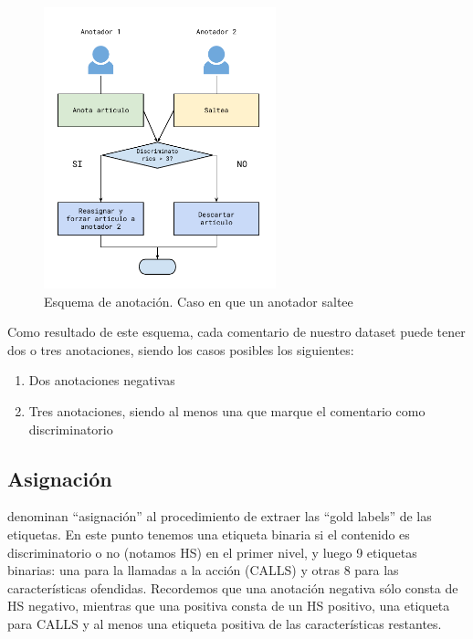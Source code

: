 \begin{figure}
    \centering
    \includegraphics[width=0.6\textwidth]{img/esquema_anotacion_caso_2.pdf}
    \caption{Esquema de anotación. Caso en que un anotador saltee}
    \label{fig:annotation_schema_case_two}
\end{figure}


Como resultado de este esquema, cada comentario de nuestro dataset puede tener dos o tres anotaciones, siendo los casos posibles los siguientes:

\begin{enumerate}
    \item Dos anotaciones negativas
    \item Tres anotaciones, siendo al menos una que marque el comentario como discriminatorio
\end{enumerate}




\subsection{Asignación}

\citet{pustejovsky2012natural} denominan ``asignación'' al procedimiento de extraer las ``gold labels'' de las etiquetas. En este punto tenemos una etiqueta binaria si el contenido es discriminatorio o no (notamos HS) en el primer nivel, y luego 9 etiquetas binarias: una para la llamadas a la acción (CALLS) y otras 8 para las características ofendidas. Recordemos que una anotación negativa sólo consta de HS negativo, mientras que una positiva consta de un HS positivo, una etiqueta para CALLS y al menos una etiqueta positiva de las características restantes.

